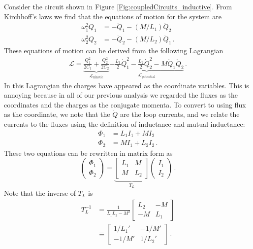 Consider the circuit shown in Figure \ref{Fig:coupledCircuits_inductive}.
From Kirchhoff's laws we find that the equations of motion for the system are
\begin{align*}
  \omega_1^2 Q_1 &= -\ddot{Q}_1 - \left(M/L_1\right) \ddot{Q}_2 \\
  \omega_2^2 Q_2 &= -\ddot{Q}_2 - \left(M/L_2\right) \ddot{Q}_1
  \, .
\end{align*}
These equations of motion can be derived from the following Lagrangian
\begin{align*}
  \mathcal{L} =
  \underbrace{
      \frac{Q_1^2}{2 C_1} + \frac{Q_2^2}{2 C_2}
  }_{\mathcal{L}_\text{kinetic}}
  \underbrace{
    - \frac{L_1}{2}\dot{Q}_1^2
    - \frac{L_2}{2}\dot{Q}_2^2
    - M \dot{Q}_1 \dot{Q}_2
  }_{\mathcal{L}_\text{potential}}
  \, . \label{eq:sec.coupling.subsec.inductiveCoupling:Lagrangian}
\end{align*}
In this Lagrangian the charges have appeared as the coordinate variables.
This is annoying because in all of our previous analysis we regarded the fluxes as the coordinates and the charges as the conjugate momenta.
To convert to using flux as the coordinate, we note that the $\dot{Q}$ are the loop currents, and we relate the currents to the fluxes using the definition of inductance and mutual inductance:
\begin{align*}
  \Phi_1 &= L_1 I_1 + M I_2 \\
  \Phi_2 &= M I_1 + L_2 I_2 \, .
\end{align*}
These two equations can be rewritten in matrix form as
\begin{equation*}
  \left( \begin{array}{c} \Phi_1 \\ \Phi_2 \end{array} \right)
  =
  \underbrace{
    \left[ \begin{array}{cc} L_1 & M \\ M & L_2 \end{array} \right]
  }_{T_L}
  \left( \begin{array}{c} I_1 \\ I_2 \end{array} \right) \, . \label{eq:sec.coupling.subsec.inductiveCoupling:fluxToI}
\end{equation*}
Note that the inverse of $T_L$ is
\begin{align*}
  T_L^{-1}
  &= \frac{1}{L_1 L_2 - M^2}
  \left[ \begin{array}{cc}
    L_2 & -M \\ -M & L_1
  \end{array} \right] \nonumber \\
  &\equiv \left[ \begin{array}{cc}
    1/L_1' & -1/M' \\ -1/M' & 1/L_2'
  \end{array} \right]
  \, .
\end{align*}
